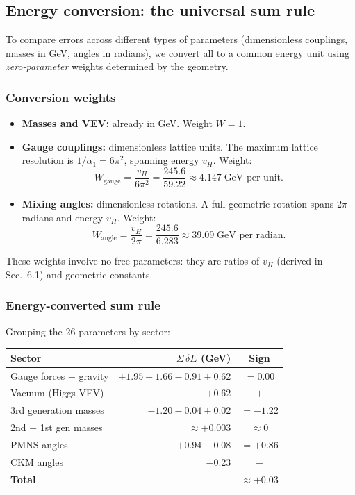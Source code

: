 \subsection{Energy conversion: the universal sum rule}

To compare errors across different types of parameters (dimensionless couplings, masses in GeV, angles in radians), we convert all to a common energy unit using \emph{zero-parameter} weights determined by the geometry.

\subsubsection{Conversion weights}

\begin{itemize}
\item \textbf{Masses and VEV:} already in GeV. Weight $W = 1$.
\item \textbf{Gauge couplings:} dimensionless lattice units. The maximum lattice resolution is $1/\alpha_1 = 6\pi^2$, spanning energy $v_H$. Weight:
\begin{equation}
W_\text{gauge} = \frac{v_H}{6\pi^2} = \frac{245.6}{59.22} \approx 4.147\;\text{GeV per unit}.
\end{equation}
\item \textbf{Mixing angles:} dimensionless rotations. A full geometric rotation spans $2\pi$ radians and energy $v_H$. Weight:
\begin{equation}
W_\text{angle} = \frac{v_H}{2\pi} = \frac{245.6}{6.283} \approx 39.09\;\text{GeV per radian}.
\end{equation}
\end{itemize}

These weights involve no free parameters: they are ratios of $v_H$ (derived in Sec.~6.1) and geometric constants.

\subsubsection{Energy-converted sum rule}

Grouping the 26 parameters by sector:

\begin{center}
\begin{tabular}{lrc}
\hline
Sector & $\Sigma\,\delta E$ (GeV) & Sign \\
\hline
Gauge forces + gravity & $+1.95 - 1.66 - 0.91 + 0.62$ & $= 0.00$ \\
Vacuum (Higgs VEV) & $+0.62$ & $+$ \\
3rd generation masses & $-1.20 - 0.04 + 0.02$ & $= -1.22$ \\
2nd + 1st gen masses & $\approx +0.003$ & $\approx 0$ \\
PMNS angles & $+0.94 - 0.08$ & $= +0.86$ \\
CKM angles & $-0.23$ & $-$ \\
\hline
\textbf{Total} & & $\approx \mathbf{+0.03}$ \\
\hline
\end{tabular}
\end{center}

